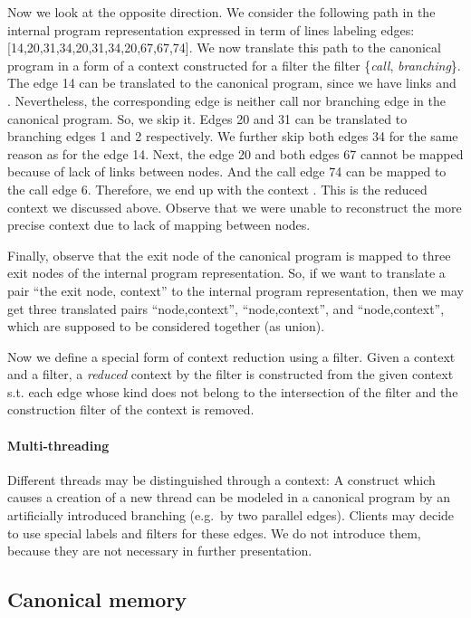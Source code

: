 \documentclass[envcountsame]{llncs}
\begin{document}
Now we look at the opposite direction. We consider the following path in the
internal program representation expressed in term of lines labeling edges:
[14,20,31,34,20,31,34,20,67,67,74]. We now translate this path to the canonical
program in a form of a context constructed for a filter the filter
\{\textit{call}, \textit{branching}\}. The edge 14 can be translated to the
canonical program, since we have links  and . Nevertheless,
the corresponding edge is neither call nor branching edge in the canonical
program. So, we skip it. Edges 20 and 31 can be translated to branching edges 1
and 2 respectively. We further skip both edges 34 for the same reason as for the
edge 14. Next, the edge 20 and both edges 67 cannot be mapped because of lack of
links between nodes. And the call edge 74 can be mapped to the call edge 6.
Therefore, we end up with the context . This is the reduced
context we discussed above. Observe that we were unable to reconstruct the more
precise context  due to lack of mapping between nodes.

Finally, observe that the exit node of the canonical program is mapped to three
exit nodes of the internal program representation. So, if we want to translate a
pair ``the exit node, context'' to the internal program representation, then we
may get three translated pairs ``node,context'', ``node,context'', and ``node,context'', which are
supposed to be considered together (as union).

Now we define a special form of context reduction using a filter. Given a
context and a filter, a \emph{reduced} context by the filter is constructed from
the given context s.t. each edge whose kind does not belong to the intersection
of the filter and the construction filter of the context is removed.

\paragraph{Multi-threading}
\label{sec:Multi-threading}

Different threads may be distinguished through a context: A construct which
causes a creation of a new thread can be modeled in a canonical program by an
artificially introduced branching (e.g.~by two parallel edges). Clients may
decide to use special labels and filters for these edges. We do not introduce
them, because they are not necessary in further presentation.


\subsection{Canonical memory}
\label{sec:CanonicalMemory}
\end{document}
